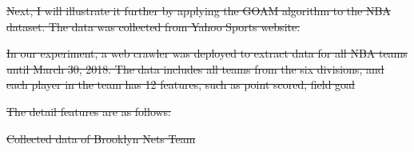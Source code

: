 \documentclass[
 size=14pt,
 paper=smartboard,  %
 mode=present, 		%
 display=slides, 	%
 style=tuliplab,  	%
 pauseslide,
 fleqn,leqno]{powerdot}
\providecommand{\DIFdeltex}[1]{{\protect\color{red}\sout{#1}}}                      %
\providecommand{\DIFdelbegin}{} %
\providecommand{\DIFdelend}{} %
\providecommand{\DIFdelFL}[1]{\DIFdel{#1}} %
\providecommand{\DIFdelendFL}{} %
\providecommand{\DIFdel}[1]{\texorpdfstring{\DIFdeltex{#1}}{}} %
\newcommand{\DIFscaledelfig}{0.5}
\newlength{\DIFdelgraphicswidth} %
\newlength{\DIFdelgraphicsheight} %
\newcommand{\DIFdelincludegraphics}[2][]{%
\sbox{\DIFdelgraphicsbox}{\DIFOincludegraphics[#1]{#2}}%
\settoboxwidth{\DIFdelgraphicswidth}{\DIFdelgraphicsbox} %
\settoboxtotalheight{\DIFdelgraphicsheight}{\DIFdelgraphicsbox} %
\scalebox{\DIFscaledelfig}{%
\parbox[b]{\DIFdelgraphicswidth}{\usebox{\DIFdelgraphicsbox}\\[-\baselineskip] \rule{\DIFdelgraphicswidth}{0em}}\llap{\resizebox{\DIFdelgraphicswidth}{\DIFdelgraphicsheight}{%
\setlength{\unitlength}{\DIFdelgraphicswidth}%
\begin{picture}(1,1)%
\thicklines\linethickness{2pt} %
{\color[rgb]{1,0,0}\put(0,0){\framebox(1,1){}}}%
{\color[rgb]{1,0,0}\put(0,0){\line( 1,1){1}}}%
{\color[rgb]{1,0,0}\put(0,1){\line(1,-1){1}}}%
\end{picture}%
}\hspace*{3pt}}} %
} %
\DeclareRobustCommand{\DIFdelbegin}{\DIFOdelbegin \let\includegraphics\DIFdelincludegraphics} %
\DeclareRobustCommand{\DIFdelend}{\DIFOaddend \let\includegraphics\DIFOincludegraphics} %
\DeclareRobustCommand{\DIFdelendFL}{\DIFOaddendFL \let\includegraphics\DIFOincludegraphics} %
\begin{document}
\DIFdelbegin %
\DIFdel{Next,
I will illustrate it further by applying the GOAM algorithm to the NBA dataset.
The data was collected from Yahoo Sports website.
}\DIFdelend %

\DIFdelbegin \DIFdel{In our experiment,
a web crawler was deployed to extract data
for all NBA teams until March 30, 2018.
The data includes all teams from the six divisions,
and each player in the team has 12 features,
such as point scored, field goal}%
\DIFdelend %

\DIFdelbegin %
\DIFdelend %


\DIFdelbegin %
\DIFdel{The detail features are as follows:
}\DIFdelend %

\DIFdelbegin %
{%
\DIFdelFL{Collected data of Brooklyn Nets Team}}
\DIFdelendFL %
\end{document}
